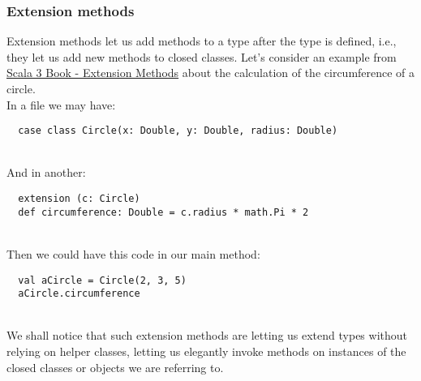 \subsubsection{Extension methods}
Extension methods let us add methods to a type after the type is defined, i.e., they let us add new methods to closed classes.
Let's consider an example from \href{https://docs.scala-lang.org/scala3/book/ca-extension-methods.html}{Scala 3 Book - Extension Methods} about the calculation of the circumference of a circle.\\
In a file we may have:
\begin{verbatim}
  case class Circle(x: Double, y: Double, radius: Double)
\end{verbatim}\mbox{}\\
And in another:
\begin{verbatim}
  extension (c: Circle)
  def circumference: Double = c.radius * math.Pi * 2
\end{verbatim}\mbox{}\\
Then we could have this code in our main method:
\begin{verbatim}
  val aCircle = Circle(2, 3, 5)
  aCircle.circumference
\end{verbatim}\mbox{}\\
We shall notice that such extension methods are letting us extend types without relying on helper classes, letting us elegantly invoke methods on instances of the closed classes or objects we are referring to.

